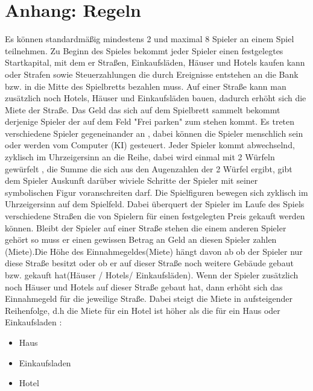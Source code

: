 \documentclass[a4paper,10pt]{article}
\begin{document}
\section{Anhang: Regeln}
Es können standardmäßig mindestens 2 und maximal 8 Spieler an einem Spiel teilnehmen. Zu Beginn des Spieles bekommt jeder Spieler einen festgelegtes Startkapital, mit dem er Straßen, Einkaufsläden, Häuser und Hotels kaufen kann oder Strafen sowie Steuerzahlungen die durch Ereignisse entstehen an die Bank bzw. in die Mitte des Spielbretts bezahlen muss. Auf einer Straße kann man zusätzlich noch Hotels, Häuser und Einkaufsläden bauen, dadurch erhöht sich die Miete der Straße. Das Geld das sich auf dem Spielbrett sammelt bekommt derjenige Spieler der auf dem Feld "Frei parken" zum stehen kommt.  Es treten verschiedene Spieler gegeneinander an , dabei können die Spieler menschlich sein oder werden vom Computer (KI) gesteuert. Jeder Spieler kommt abwechselnd, zyklisch im Uhrzeigersinn an die Reihe, dabei wird einmal mit 2 Würfeln gewürfelt , die Summe die sich aus den Augenzahlen der 2 Würfel ergibt, gibt dem Spieler Auskunft darüber wiviele Schritte der Spieler mit seiner symbolischen Figur voranschreiten darf. Die Spielfiguren bewegen sich zyklisch im Uhrzeigersinn auf dem Spielfeld. Dabei überquert der Spieler im Laufe des Spiels verschiedene Straßen die von Spielern für einen festgelegten Preis gekauft werden können. Bleibt der Spieler auf einer Straße stehen die einem anderen Spieler gehört so muss er einen gewissen Betrag an Geld an diesen Spieler zahlen (Miete).Die Höhe des Einnahmegeldes(Miete) hängt davon ab ob der Spieler nur diese Straße besitzt oder ob er auf dieser Straße noch weitere Gebäude gebaut bzw. gekauft hat(Häuser / Hotels/ Einkaufsläden). Wenn der Spieler zusätzlich noch Häuser und Hotels auf dieser Straße gebaut hat, dann erhöht sich das Einnahmegeld für die jeweilige Straße. Dabei steigt die Miete in aufsteigender Reihenfolge, d.h die Miete für ein Hotel ist höher als die für ein Haus oder Einkaufsladen :
\begin {itemize}
\item Haus
\item Einkaufsladen
\item Hotel
\end {itemize}
\end{document}
